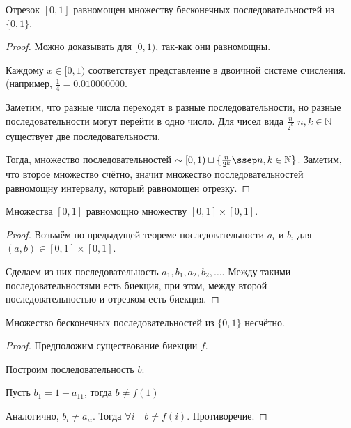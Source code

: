 \begin{theorem} \thmslashn

    Отрезок $[0, 1]$ равномощен множеству бесконечных последовательностей из $\{0, 1\} $.
    \begin{proof} \thmslashn
   
        Можно доказывать для $[0, 1)$, так-как они равномощны.

        Каждому $x\in [0, 1)$ соответствует представление в двоичной системе счисления. (например, $\frac{1}{4} = 0.010000000$.

        Заметим, что разные числа переходят в разные последовательности, но разные последовательности могут перейти в одно число. Для чисел вида $\frac{n}{2^{k}}$  $n, k \in \mathbb{N}$ существует две последовательности. 

        Тогда, множество последовательностей $\sim [0, 1) \sqcup \{\frac{n}{2^{k}}\ssep n, k\in \mathbb{N}\}$. Заметим, что второе множество счётно, значит множество последовательностей равномощну интервалу, который равномощен отрезку.
    \end{proof}
\end{theorem}
\begin{theorem} \thmslashn

    Множества $[0, 1]$ равномощно множеству $[0, 1] \times [0, 1]$.

    \begin{proof} \thmslashn
    
        Возьмём по предыдущей теореме последовательности $a_{i}$ и $b_{i}$ для $(a, b)\in [0, 1] \times [0, 1]$.

        Сделаем из них последовательность $a_1, b_1, a_2, b_{2}, \ldots$. Между такими последовательностями есть биекция, при этом, между второй последовательностью и отрезком есть биекция.
    \end{proof}
\end{theorem}
\begin{theorem} \thmslashn

    Множество бесконечных последовательностей из $\{0, 1\} $ несчётно.
    \begin{proof} \thmslashn
    
        Предположим существование биекции $f$.

        Построим последовательность $b$:
        
        Пусть $b_{1} = 1-a_{11}$, тогда $b \neq f(1)$

        Аналогично, $b_{i} \neq a_{ii}$. Тогда $\forall{i}\quad b \neq f(i)$. Противоречие.
    \end{proof}
\end{theorem}

